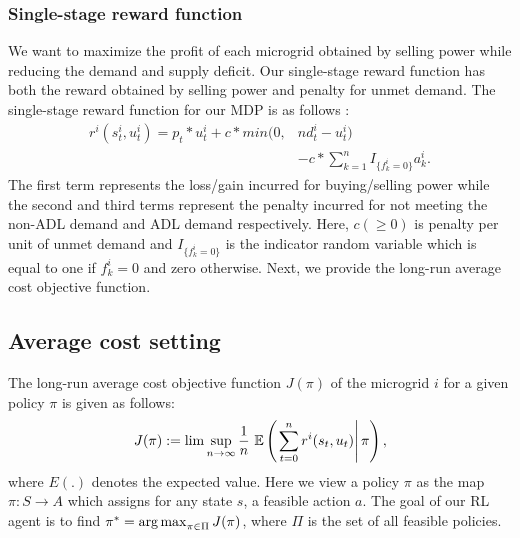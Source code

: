 \subsubsection{Single-stage reward function}
We want to maximize the profit of each microgrid obtained by selling power while reducing the demand and supply deficit. Our single-stage reward function has both the reward obtained by selling power and penalty for unmet demand. The single-stage reward  function for our MDP is as follows :
\begin{align}
r^{i}(s_t^i,u_t^i) = p_{t}*u_{t}^{i} + c*min(0,&nd_{t}^{i} - u_{t}^{i})  \nonumber\\ & - c* \sum_{k =1}^{n} I_{\{f_{k}^{i} = 0\}} a_{k}^{i} .
\end{align}
The first term represents the loss/gain incurred for  buying/selling  power while the second and third terms represent the penalty  incurred for not meeting the non-ADL demand and ADL demand respectively. Here, $c (\ge 0)$ is penalty per unit of unmet demand and $I_{\{f_{k}^{i} = 0\}}$ is the indicator random variable which is equal to one if $f_{k}^{i} =0$ and zero otherwise. 
Next, we provide the long-run average cost objective function. 
\subsection{Average cost setting} \label{subsec:avg}
The long-run average cost objective function $J(\pi)$ of the microgrid $i$ for a given policy $\pi$ is given as follows:
\begin{align}
J(\pi) := \lim \sup_{n \rightarrow \infty}\frac{1}{n} \,\, \mathbb{E} \left(\left.\sum_{t = 0}^{n} r^{i} (s_{t},u_{t})\right|\pi \right),
\end{align}
where $E(.)$ denotes the expected value. Here we view a policy $\pi$ as the map $\pi : S \to A$ which assigns for any state $s$, a feasible action $a$. The goal of our RL agent is to find $\pi^* = \mathop{\rm arg\,max}_{\pi \in \Pi} J(\pi)$, where $\Pi$ is the set of all feasible policies.

%
%

